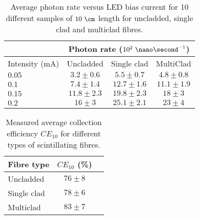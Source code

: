 \begin{table}[htbp]
\centering{}%
\begin{tabular}{lccc}
\toprule 
 & \multicolumn{3}{c}{Photon rate ($10^{2}~\nano\second^{-1}$)} \tabularnewline
\midrule
Intensity (mA) & Uncladded & Single clad & MultiClad \tabularnewline
\midrule
\midrule
$0.05$ & $3.2 \pm 0.6$ & $5.5 \pm 0.7$ & $4.8 \pm 0.8$ \tabularnewline
$0.1$ & $7.4 \pm 1.4$ & $12.7 \pm 1.6$ & $11.1 \pm 1.9$ \tabularnewline
$0.15$ & $11.8 \pm 2.3$ & $19.8 \pm 2.3$ & $18\pm 3$ \tabularnewline
$0.2$ & $16 \pm 3$ & $25.1 \pm 2.1$ & $23 \pm 4$ \tabularnewline
\bottomrule
\end{tabular}
\caption{Average photon rate versus LED bias current for 10 different samples of $10~\cm$ length for uncladded, single clad and multiclad fibres.}
\label{tab:10DifferentSamplesAlltypes}
\end{table}


\begin{table}[htbp]
\centering{}%
\begin{tabular}{lcc}
\toprule 
Fibre type & $CE_{10}$ (\%) \tabularnewline
\midrule
\midrule 
Uncladded & $76 \pm 8$ \tabularnewline
Single clad & $78 \pm 6$ \tabularnewline
Multiclad & $83 \pm 7$ \tabularnewline
\bottomrule
\end{tabular}
\caption{Measured average collection efficiency $CE_{10}$ for different types of scintillating fibres.}
\label{tab:CollectionEfficiencyOfFibers}
\end{table}



